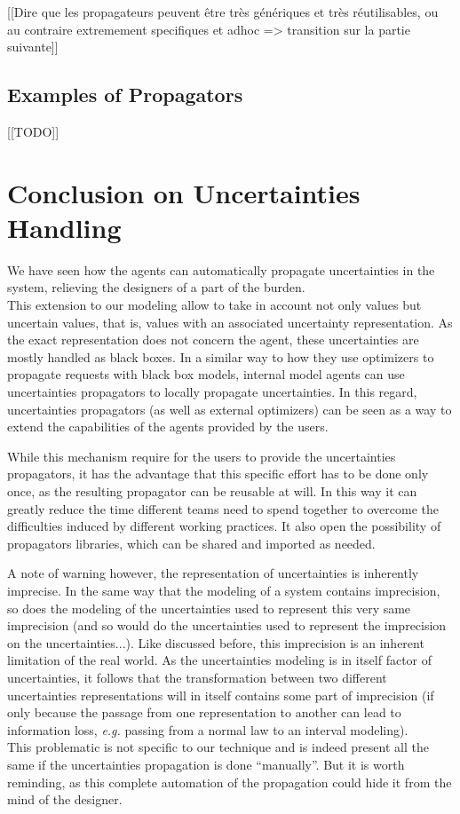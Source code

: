 [[Dire que les propagateurs peuvent être très génériques et très réutilisables, ou au contraire extremement specifiques et adhoc => transition sur la partie suivante]]


\subsection{Examples of Propagators}

[[TODO]]

\section{Conclusion on Uncertainties Handling}

We have seen how the agents can automatically propagate uncertainties in the system, relieving the designers of a part of the burden.\\
This extension to our modeling allow to take in account not only values but uncertain values, that is, values with an associated uncertainty representation. As the exact representation does not concern the agent, these uncertainties are mostly handled as black boxes. In a similar way to how they use optimizers to propagate requests with black box models, internal model agents can use uncertainties propagators to locally propagate uncertainties. In this regard, uncertainties propagators (as well as external optimizers) can be seen as a way to extend the capabilities of the agents provided by the users.

While this mechanism require for the users to provide the uncertainties propagators, it has the advantage that this specific effort has to be done only once, as the resulting propagator can be reusable at will. In this way it can greatly reduce the time different teams need to spend together to overcome the difficulties induced by different working practices. It also open the possibility of propagators libraries, which can be shared and imported as needed.

A note of warning however, the representation of uncertainties is inherently imprecise. In the same way that the modeling of a system contains imprecision, so does the modeling of the uncertainties used to represent this very same imprecision (and so would do the uncertainties used to represent the imprecision on the uncertainties...). Like discussed before, this imprecision is an inherent limitation of the real world. As the uncertainties modeling is in itself factor of uncertainties, it follows that the transformation between two different uncertainties representations will in itself contains some part of imprecision (if only because the passage from one representation to another can lead to information loss, \emph{e.g.} passing from a normal law to an interval modeling).\\
This problematic is not specific to our technique and is indeed  present all the same if the uncertainties propagation is done \enquote{manually}. But it is worth reminding, as this complete automation of the propagation could hide it from the mind of the designer.

